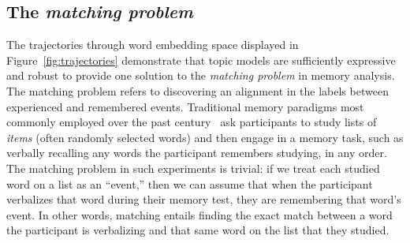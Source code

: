 \documentclass{article}
\begin{document}
\subsection*{The \textit{matching problem}}
The trajectories through word embedding space displayed in Figure~\ref{fig:trajectories} demonstrate that topic models are sufficiently expressive and robust to provide one solution to the \textit{matching problem} in memory analysis.  The matching problem refers to discovering an alignment in the labels between experienced and remembered events.  Traditional memory paradigms most commonly employed over the past century~\citep{Kaha12} ask participants to study lists of \textit{items} (often randomly selected words) and then engage in a memory task, such as verbally recalling any words the participant remembers studying, in any order.  The matching problem in such experiments is trivial: if we treat each studied word on a list as an ``event,'' then we can assume that when the participant verbalizes that word during their memory test, they are remembering that word's event.  In other words, matching entails finding the exact match between a word the participant is verbalizing and that same word on the list that they studied.
\end{document}
